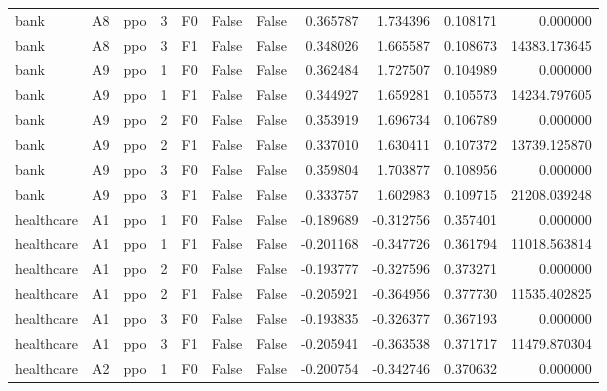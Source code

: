 \begin{tabular}{lllrlllrrrr}
      bank &      A8 &       ppo &     3 &  F0 &           False &            False &  0.365787 &  1.734396 & 0.108171 &         0.000000 \\
      bank &      A8 &       ppo &     3 &  F1 &           False &            False &  0.348026 &  1.665587 & 0.108673 &     14383.173645 \\
      bank &      A9 &       ppo &     1 &  F0 &           False &            False &  0.362484 &  1.727507 & 0.104989 &         0.000000 \\
      bank &      A9 &       ppo &     1 &  F1 &           False &            False &  0.344927 &  1.659281 & 0.105573 &     14234.797605 \\
      bank &      A9 &       ppo &     2 &  F0 &           False &            False &  0.353919 &  1.696734 & 0.106789 &         0.000000 \\
      bank &      A9 &       ppo &     2 &  F1 &           False &            False &  0.337010 &  1.630411 & 0.107372 &     13739.125870 \\
      bank &      A9 &       ppo &     3 &  F0 &           False &            False &  0.359804 &  1.703877 & 0.108956 &         0.000000 \\
      bank &      A9 &       ppo &     3 &  F1 &           False &            False &  0.333757 &  1.602983 & 0.109715 &     21208.039248 \\
healthcare &      A1 &       ppo &     1 &  F0 &           False &            False & -0.189689 & -0.312756 & 0.357401 &         0.000000 \\
healthcare &      A1 &       ppo &     1 &  F1 &           False &            False & -0.201168 & -0.347726 & 0.361794 &     11018.563814 \\
healthcare &      A1 &       ppo &     2 &  F0 &           False &            False & -0.193777 & -0.327596 & 0.373271 &         0.000000 \\
healthcare &      A1 &       ppo &     2 &  F1 &           False &            False & -0.205921 & -0.364956 & 0.377730 &     11535.402825 \\
healthcare &      A1 &       ppo &     3 &  F0 &           False &            False & -0.193835 & -0.326377 & 0.367193 &         0.000000 \\
healthcare &      A1 &       ppo &     3 &  F1 &           False &            False & -0.205941 & -0.363538 & 0.371717 &     11479.870304 \\
healthcare &      A2 &       ppo &     1 &  F0 &           False &            False & -0.200754 & -0.342746 & 0.370632 &         0.000000 \\

\end{tabular}
